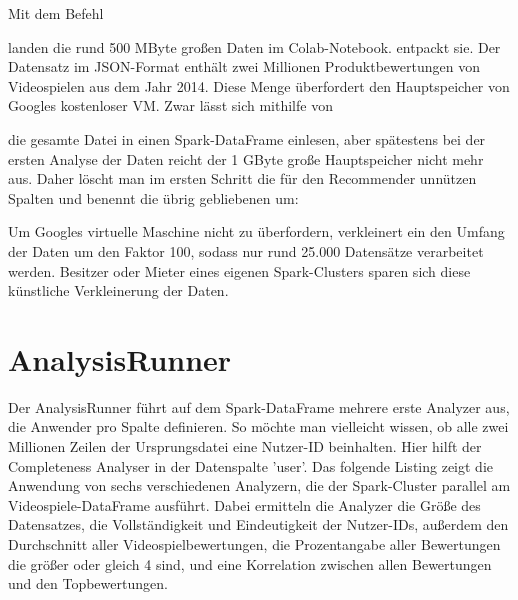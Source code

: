 Mit dem Befehl

\medskip


\medskip

landen die rund 500 MByte großen Daten im Colab-Notebook.  entpackt sie. Der Datensatz im JSON-Format enthält zwei Millionen Produktbewertungen von Videospielen aus dem Jahr 2014. Diese Menge überfordert den Hauptspeicher von Googles kostenloser VM. Zwar lässt sich mithilfe von

\medskip


\medskip

die gesamte Datei in einen Spark-DataFrame einlesen, aber spätestens bei der ersten Analyse der Daten reicht der 1 GByte große Hauptspeicher nicht mehr aus. Daher löscht man im ersten Schritt die für den Recommender unnützen Spalten und benennt die übrig gebliebenen um:
\medskip



\medskip

Um Googles virtuelle Maschine nicht zu überfordern, verkleinert ein  den Umfang der Daten um den Faktor 100, sodass nur rund 25.000 Datensätze verarbeitet werden. Besitzer oder Mieter eines eigenen Spark-Clusters sparen sich diese künstliche Verkleinerung der Daten.

\section{AnalysisRunner}

Der AnalysisRunner führt auf dem Spark-DataFrame mehrere erste Analyzer aus, die Anwender pro Spalte definieren. So möchte man vielleicht wissen, ob alle zwei Millionen Zeilen der Ursprungsdatei eine Nutzer-ID beinhalten. Hier hilft der Completeness Analyser in der Datenspalte 'user'. Das folgende Listing zeigt die Anwendung von sechs verschiedenen Analyzern, die der Spark-Cluster parallel am Videospiele-DataFrame ausführt. Dabei ermitteln die Analyzer die Größe des Datensatzes, die Vollständigkeit und Eindeutigkeit der Nutzer-IDs, außerdem den Durchschnitt aller Videospielbewertungen, die Prozentangabe aller Bewertungen die größer oder gleich 4 sind, und eine Korrelation zwischen allen Bewertungen und den Topbewertungen.

